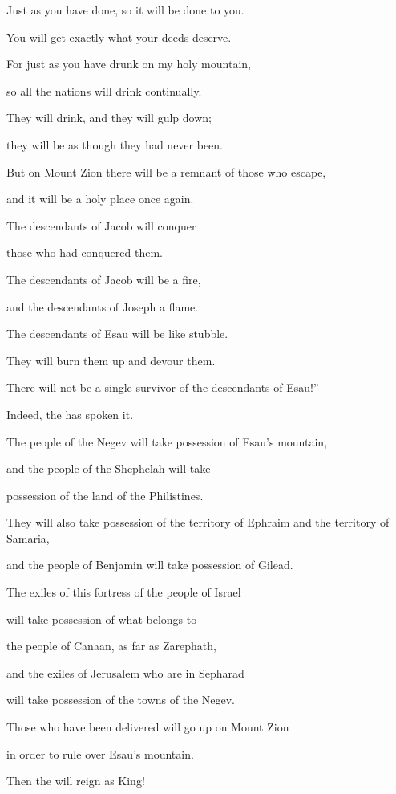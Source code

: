 {\par }{\Q Just
as you have done,
so it will be done
to you.
\par }{\Q You will get exactly what your deeds deserve.
\par }{\Q {}For
just
as you have drunk
on
my holy
mountain,
\par }{\Q so all
the nations
will drink
continually.
\par }{\Q They will drink,
and they will gulp down;
\par }{\Q they will be
as though they had never
been.
\par }{\Q {}But on Mount
Zion
there will be
a remnant
of those who escape,

\par }{\Q and it will be
a holy
place once again.
\par }{\Q The descendants
of Jacob
will conquer
\par }{\Q those who had conquered them.
\par }{\Q {}The descendants
of Jacob
will be
a fire,
\par }{\Q and the descendants
of Joseph
a flame.
\par }{\Q The descendants
of Esau
will be like stubble.
\par }{\Q They will burn them up
and devour
them.
\par }{\Q There will not
be
a single survivor
of the descendants
of Esau!”
\par }{\Q Indeed,
the {}
has spoken it.
\par }{\Q {}The people of the
Negev
will take possession
of Esau’s
mountain,
\par }{\Q and the people of the Shephelah
will take
\par }{\Q possession of the
land of the Philistines.
\par }{\Q They will also take possession
of the
territory
of Ephraim
and the
territory
of Samaria,
\par }{\Q and the people of Benjamin
will take possession of Gilead.
\par }{\Q {}The exiles
of this
fortress
of the people of Israel
\par }{\Q will take possession of what belongs
to
\par }{\Q the people of Canaan,
as far
as Zarephath,
\par }{\Q and the
exiles
of Jerusalem
who
are in Sepharad
\par }{\Q will take possession
of the towns
of the Negev.
\par }{\Q {}Those who have been delivered
will go up
on Mount
Zion
\par }{\Q in order
to rule over
Esau’s
mountain.
\par }{\PP Then
the {}
will reign as King!
\par }